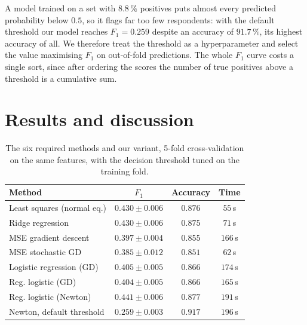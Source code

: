 \documentclass[10pt,conference,compsocconf]{IEEEtran}
\begin{document}
A model trained on a set with $8.8\,\%$ positives puts almost every predicted
probability below $0.5$, so it flags far too few respondents: with the default
threshold our model reaches $F_1 = 0.259$ despite an accuracy of $91.7\,\%$,
its highest accuracy of all. We therefore treat the threshold as a hyperparameter
and select the value maximising $F_1$ on out-of-fold predictions. The whole
$F_1$ curve costs a single sort, since after ordering the scores the number of
true positives above a threshold is a cumulative sum.

\section{Results and discussion}

\begin{table}[t]
\centering
\caption{The six required methods and our variant, 5-fold cross-validation on
the same features, with the decision threshold tuned on the training fold.}
\label{tab:methods}
\small
\begin{tabular}{lccc}
\toprule
Method & $F_1$ & Accuracy & Time \\
\midrule
Least squares (normal eq.) & $0.430 \pm 0.006$ & $0.876$ & $55$\,s \\
Ridge regression & $0.430 \pm 0.006$ & $0.875$ & $71$\,s \\
MSE gradient descent & $0.397 \pm 0.004$ & $0.855$ & $166$\,s \\
MSE stochastic GD & $0.385 \pm 0.012$ & $0.851$ & $62$\,s \\
Logistic regression (GD) & $0.405 \pm 0.005$ & $0.866$ & $174$\,s \\
Reg. logistic (GD) & $0.404 \pm 0.005$ & $0.866$ & $165$\,s \\
Reg. logistic (Newton) & $0.441 \pm 0.006$ & $0.877$ & $191$\,s \\
Newton, default threshold & $0.259 \pm 0.003$ & $0.917$ & $196$\,s \\
\bottomrule
\end{tabular}
\end{table}
\end{document}
